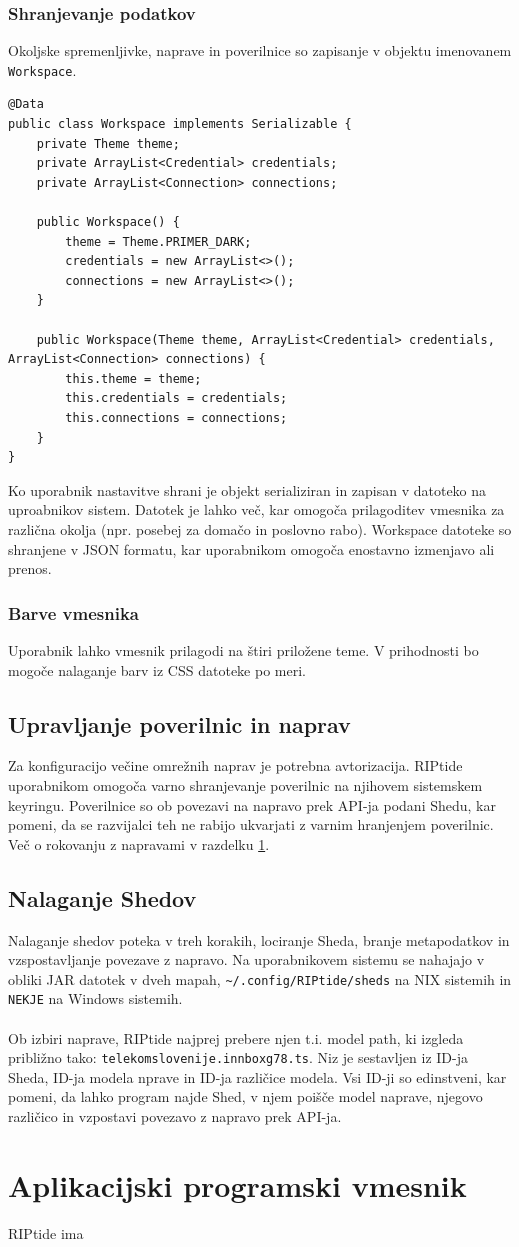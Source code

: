 \documentclass[12pt]{article}
\begin{document}
\subsubsection{Shranjevanje podatkov}
Okoljske spremenljivke, naprave in poverilnice so zapisanje v objektu
imenovanem \verb|Workspace|.

\begin{lstlisting}
@Data
public class Workspace implements Serializable {
	private Theme theme;
	private ArrayList<Credential> credentials;
	private ArrayList<Connection> connections;

	public Workspace() {
		theme = Theme.PRIMER_DARK;
		credentials = new ArrayList<>();
		connections = new ArrayList<>();
	}

	public Workspace(Theme theme, ArrayList<Credential> credentials, ArrayList<Connection> connections) {
		this.theme = theme;
		this.credentials = credentials;
		this.connections = connections;
	}
}
\end{lstlisting}
Ko uporabnik nastavitve shrani je objekt serializiran in zapisan v datoteko
na uproabnikov sistem. Datotek je lahko več, kar omogoča prilagoditev
vmesnika za različna okolja (npr. posebej za domačo in poslovno rabo).
Workspace datoteke so shranjene v JSON formatu, kar uporabnikom omogoča
enostavno izmenjavo ali prenos.

\subsubsection{Barve vmesnika}
Uporabnik lahko vmesnik prilagodi na štiri priložene teme. V prihodnosti
bo mogoče nalaganje barv iz CSS datoteke po meri.

\subsection{Upravljanje poverilnic in naprav}
Za konfiguracijo večine omrežnih naprav je potrebna avtorizacija.
RIPtide uporabnikom omogoča varno shranjevanje poverilnic na njihovem
sistemskem keyringu. Poverilnice so ob povezavi na napravo prek API-ja
podani Shedu, kar pomeni, da se razvijalci teh ne rabijo ukvarjati z
varnim hranjenjem poverilnic. Več o rokovanju z napravami v razdelku
\ref{api}.

\subsection{Nalaganje Shedov}
Nalaganje shedov poteka v treh korakih, lociranje Sheda, branje
metapodatkov in vzspostavljanje povezave z napravo. Na uporabnikovem
sistemu se nahajajo v obliki JAR datotek v dveh mapah,
\verb|~/.config/RIPtide/sheds| na NIX sistemih in \verb|NEKJE|
na Windows sistemih.
\\\\
Ob izbiri naprave, RIPtide najprej prebere njen t.i. model path, ki
izgleda približno tako: \verb|telekomslovenije.innboxg78.ts|. Niz je
sestavljen iz ID-ja Sheda, ID-ja modela nprave in ID-ja različice
modela. Vsi ID-ji so edinstveni, kar pomeni, da lahko program
najde Shed, v njem poišče model naprave, njegovo različico in
vzpostavi povezavo z napravo prek API-ja.
\newpage

\section{Aplikacijski programski vmesnik} \label{api}
RIPtide ima 
\newpage
\end{document}
